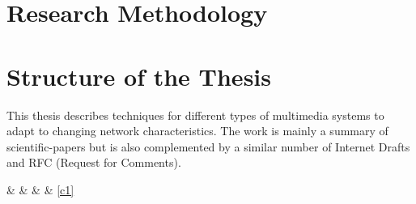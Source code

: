 

\section{Research Methodology}

\section{Structure of the Thesis}

This thesis describes techniques for different types of multimedia systems to
adapt to changing network characteristics.  The work is mainly a summary of
scientific-papers but is also  complemented by a similar number of Internet
Drafts and RFC (Request for Comments).





 \&  \&   \& \pageref{c1} \& \ref{c1} 




